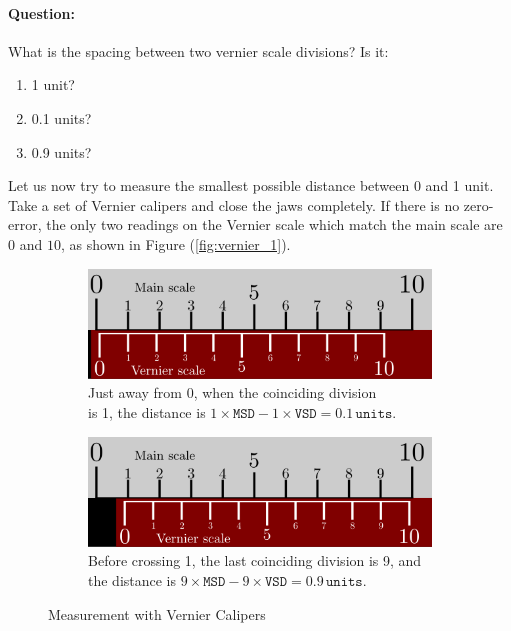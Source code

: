 \begin{question}
    \paragraph{Question:} What is the spacing between two vernier scale divisions? Is it:
    \begin{enumerate}
        \item 1 unit?
        \item 0.1 units?
        \item 0.9 units?
    \end{enumerate}
\end{question}

Let us now try to measure the smallest possible distance between 0 and 1 unit. Take a set of Vernier calipers and close the jaws completely. If there is no zero-error, the only two readings on the Vernier scale which match the main scale are $0$ and $10$, as shown in Figure (\ref{fig:vernier_1}).

\begin{figure}[!htb]
        \begin{subfigure}[b]{0.5\textwidth}
                \includegraphics[width=0.95\linewidth]{figs/vernier2.png}
                \caption{Just away from 0, when the coinciding division \\is 1, the distance is $1\times\texttt{MSD}-1\times\texttt{VSD}=0.1\, \texttt{units}$.}
                \label{fig:vernier_2}
        \end{subfigure}\hfill
        \begin{subfigure}[b]{0.5\textwidth}
                \includegraphics[width=0.95\linewidth]{figs/vernier3.png}
                \caption{Before crossing 1, the last coinciding division is 9, and the distance is $9\times\texttt{MSD}-9\times\texttt{VSD}=0.9\, \texttt{units}$.}
                \label{fig:vernier_3}
        \end{subfigure}%
        \caption{Measurement with Vernier Calipers}
        \label{fig:verniermeasurements}
\end{figure}

